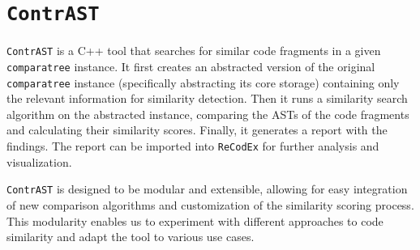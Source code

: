 \chapter{\texttt{ContrAST}}\label{sec:contrast}

\texttt{ContrAST} is a C++ tool that searches for similar code fragments in a given \texttt{comparatree} instance.
It first creates an abstracted version of the original \texttt{comparatree} instance (specifically abstracting its core storage) containing only the relevant information for similarity detection.
Then it runs a similarity search algorithm on the abstracted instance, comparing the ASTs of the code fragments and calculating their similarity scores.
Finally, it generates a report with the findings.
The report can be imported into \texttt{ReCodEx} for further analysis and visualization.

\texttt{ContrAST} is designed to be modular and extensible, allowing for easy integration of new comparison algorithms and customization of the similarity scoring process.
This modularity enables us to experiment with different approaches to code similarity and adapt the tool to various use cases.





